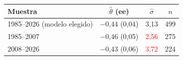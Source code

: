 \begin{tabular}{lccc}
\toprule
Muestra & $\hat\theta$ (ee) & $\hat\sigma$ & $n$
\\ \midrule
1985--2026 (modelo elegido) & \ensuremath{-}0{,}44 (0{,}04) & 3{,}13 & 499 \\
1985--2007 & \ensuremath{-}0{,}46 (0{,}05) & \textcolor{red}{2{,}56} & 275 \\
2008--2026 & \ensuremath{-}0{,}43 (0{,}06) & \textcolor{red}{3{,}72} & 224 \\
\bottomrule
\end{tabular}
